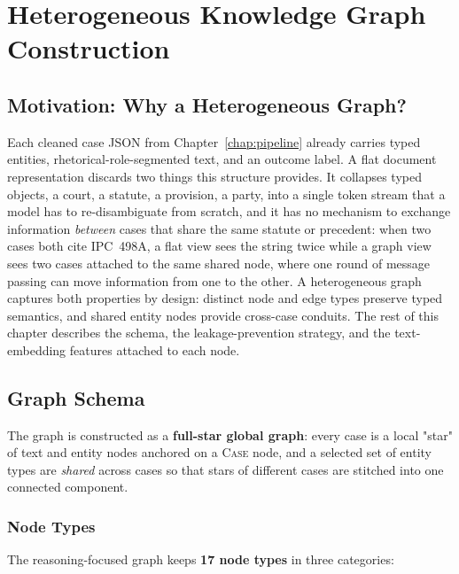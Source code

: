 \chapter{Heterogeneous Knowledge Graph Construction}
\label{chap:kg}

\section{Motivation: Why a Heterogeneous Graph?}
\label{sec:kg_motivation}

Each cleaned case JSON from Chapter~\ref{chap:pipeline} already carries
typed entities, rhetorical-role-segmented text, and an outcome label.
A flat document representation discards two things this structure
provides. It collapses typed objects, a court, a statute, a
provision, a party, into a single token stream that a model has to
re-disambiguate from scratch, and it has no mechanism to exchange
information \emph{between} cases that share the same statute or
precedent: when two cases both cite IPC~498A, a flat view sees the
string twice while a graph view sees two cases attached to the same
shared node, where one round of message passing can move information
from one to the other. A heterogeneous graph captures both properties
by design: distinct node and edge types preserve typed semantics, and
shared entity nodes provide cross-case conduits. The rest of this
chapter describes the schema, the leakage-prevention strategy, and the
text-embedding features attached to each node.

\section{Graph Schema}
\label{sec:graph_schema}

The graph is constructed as a \textbf{full-star global graph}: every
case is a local "star" of text and entity nodes anchored on a
\textsc{Case} node, and a selected set of entity types are
\emph{shared} across cases so that stars of different cases are
stitched into one connected component.

\subsection{Node Types}

The reasoning-focused graph keeps \textbf{17 node types} in three
categories:

